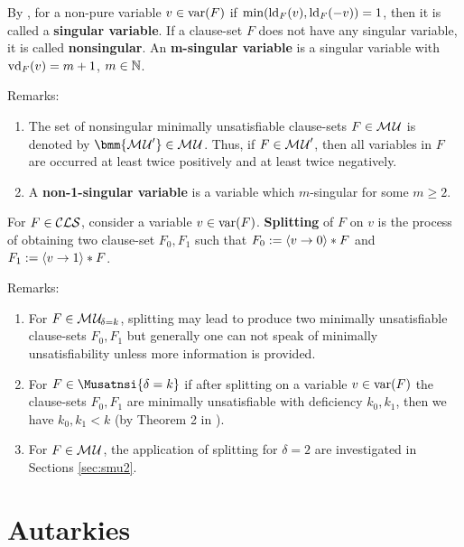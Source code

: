 \documentclass{report}
\begin{document}
\begin{defi}\label{def:singvar}
By \cite{KullmannZhao2012ConfluenceJ}, for a non-pure variable $v \in \operatorname{var}(F)$ if $\min(\operatorname{ld}_F(v) ,\operatorname{ld}_F(-v))=1$, then it is called a \textbf{singular variable}. If a clause-set $F$ does not have any singular variable, it is called \textbf{nonsingular}. An \textbf{m-singular variable} is a singular variable with $\operatorname{vd}_F(v)=m+1$, $m \in \mathbb{N}$.
\end{defi}
Remarks:
  \begin{enumerate}
  \item The set of nonsingular minimally unsatisfiable clause-sets $F \in \mathcal{M\hspace{0.8pt}U}$ is denoted by $\bmm{\Musat'} \in \Musat$. Thus, if $F \in \mathcal{M\hspace{0.8pt}U}'$, then all variables in $F$ are occurred at least twice positively and at least twice negatively.
  \item A \textbf{non-1-singular variable} is a variable which $m$-singular for some $m \ge 2$.
   \end{enumerate}
 
\begin{defi}\label{def:splitting}
For $F \in \mathcal{CLS}$, consider a variable $v \in \operatorname{var}(F)$. \textbf{Splitting} of $F$ on $v$ is the process of obtaining two clause-set $F_0,F_1$ such that  $F_0:=\langle v \rightarrow 0 \rangle * F$ and $F_1:=\langle v \rightarrow 1 \rangle * F$.
\end{defi}
Remarks:
  \begin{enumerate}
  \item For $F \in\mathcal{M\hspace{0.8pt}U}_{\!\delta=k}$, splitting may lead to produce two minimally unsatisfiable clause-sets $F_0,F_1$ but generally one can not speak of minimally unsatisfiability unless more information is provided. 
  \item For $F \in\Musatnsi{\delta=k}$ if after splitting on a variable $v \in \operatorname{var}(F)$ the clause-sets $F_0,F_1$ are minimally unsatisfiable with deficiency $k_0, k_1$, then we have $k_0, k_1 < k$ (by Theorem 2 in \cite{KleineBuening2000SubclassesMU}).
  \item For $F \in \mathcal{M\hspace{0.8pt}U}$, the application of splitting for $\delta=2$ are investigated in Sections \ref{sec:smu2}.
  \end{enumerate}
\section{Autarkies}
\label{sec:autrk}
\end{document}
